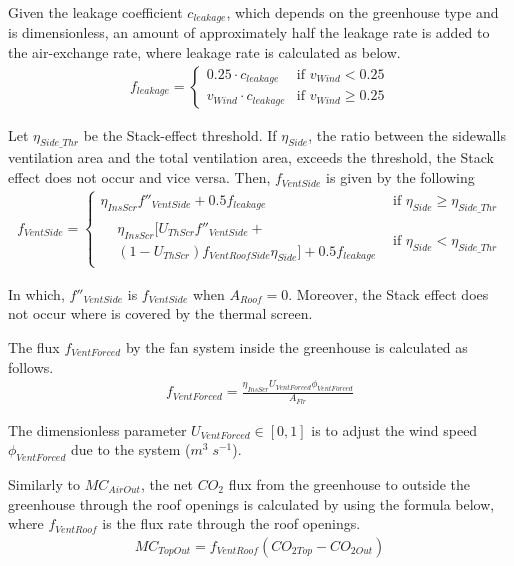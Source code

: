 \documentclass[a4paper]{article}
\begin{document}
Given the leakage coefficient \(c_{leakage}\), which depends on the greenhouse type and is dimensionless, an amount of approximately half the leakage rate is added to the air-exchange rate, where leakage rate is calculated as below.
\begin{align}
  f_{leakage} = \begin{cases}
    0.25 \cdot c_{leakage}     & \text{if~} v_{Wind} < 0.25    \\
    v_{Wind} \cdot c_{leakage} & \text{if~} v_{Wind} \geq 0.25
  \end{cases}
\end{align}

Let \(\eta_{Side\_Thr}\) be the Stack-effect threshold. If \(\eta_{Side}\), the ratio between the sidewalls ventilation
area and the total ventilation area, exceeds the threshold, the Stack effect does not occur and vice versa. Then, \(f_{VentSide}\) is given by the following
\begin{gather}
  f_{VentSide} =
  \begin{cases}
    \eta_{InsScr} f''_{VentSide} + 0.5f_{leakage} & \text{if~} \eta_{Side} \geq \eta_{Side\_Thr} \\
    \begin{split}
      & \eta_{InsScr} [U_{ThScr}f''_{VentSide} + \\
      & (1-U_{ThScr})f_{VentRoofSide} \eta_{Side}] + 0.5 f_{leakage}
    \end{split}                    & \text{if~} \eta_{Side} < \eta_{Side\_Thr}
  \end{cases}
\end{gather}

In which,  \(f''_{VentSide}\) is  \(f_{VentSide}\) when \(A_{Roof} = 0\).
Moreover, the Stack effect does not occur where is covered by the thermal screen.

The flux \(f_{VentForced}\) by the fan system inside the greenhouse is calculated as follows.
\begin{align}
  f_{VentForced} = \frac{\eta_{InsScr} U_{VentForced} \phi_{VentForced} } {A_{Flr}}
\end{align}

The dimensionless parameter \(U_{VentForced} \in [0,1]\) is to adjust the wind speed \(\phi_{VentForced}\) due to
the system (\(m^3\;s^{-1}\)).

Similarly to \(MC_{AirOut}\), the net \(CO_2\) flux from the greenhouse to outside the greenhouse through the roof openings is calculated by using the formula below, where \(f_{VentRoof}\) is the flux rate through the roof openings.
\begin{align}
  MC_{TopOut} = f_{VentRoof}(CO_{2 Top} - CO_{2 Out})
\end{align}
\end{document}
